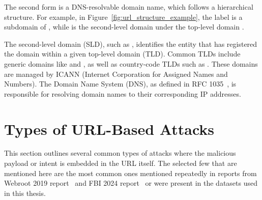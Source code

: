 The second form is a DNS-resolvable domain name, which follows a hierarchical structure. For example, in Figure~\ref{fig:url_structure_example}, the label  is a subdomain of , while  is the second-level domain under the top-level domain .

The second-level domain (SLD), such as , identifies the entity that has registered the domain within a given top-level domain (TLD). Common TLDs include generic domains like  and , as well as country-code TLDs such as . These domains are managed by ICANN (Internet Corporation for Assigned Names and Numbers). The Domain Name System (DNS), as defined in RFC 1035~\cite{rfc1035}, is responsible for resolving domain names to their corresponding IP addresses.

\section{Types of URL-Based Attacks}
\label{sec:types_of_url_attacks}

This section outlines several common types of attacks where the malicious payload or intent is embedded in the URL itself. The selected few that are mentioned here are the most common ones mentioned repeatedly in reports from Webroot 2019 report~\cite{webroot2019} and FBI 2024 report~\cite{fbi2024ic3report} or were present in the datasets used in this thesis.

